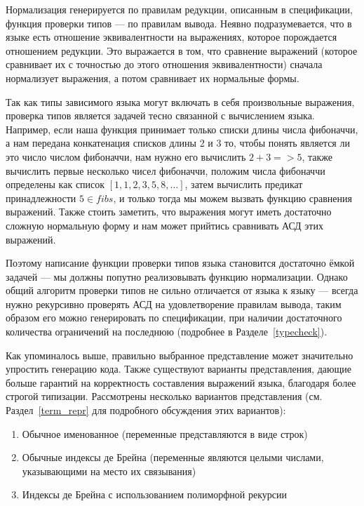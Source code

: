 Нормализация генерируется по правилам редукции, описанным в спецификации, функция проверки типов --- по правилам вывода. Неявно подразумевается, что в языке есть отношение эквивалентности на выражениях, которое порождается отношением редукции. Это выражается в том, что сравнение выражений (которое сравнивает их с точностью до этого отношения эквивалентности) сначала нормализует выражения, а потом сравнивает их нормальные формы.

Так как типы зависимого языка могут включать в себя произвольные выражения, проверка типов является задачей тесно связанной с вычислением языка. Например, если наша функция принимает только списки длины числа фибоначчи, а нам передана конкатенация списков длины 2 и 3 то, чтобы понять является ли это число числом фибоначчи, нам нужно его вычислить $2 + 3 => 5$, также вычислить первые несколько чисел фибоначчи, положим числа фибоначчи определены как список $[1,1,2,3,5,8,...]$, затем вычислить предикат принадлежности $5 \in fibs$, и только тогда мы можем вызвать функцию сравнения выражений. Также стоить заметить, что выражения могут иметь достаточно сложную нормальную форму и нам может прийтись сравнивать АСД этих выражений.

Поэтому написание функции проверки типов языка становится достаточно ёмкой задачей --- мы должны попутно реализовывать функцию нормализации. Однако общий алгоритм проверки типов не сильно отличается от языка к языку --- всегда нужно рекурсивно проверять АСД на удовлетворение правилам вывода, таким образом его можно генерировать по спецификации, при наличии достаточного количества ограничений на последнюю (подробнее в Разделе~\ref{typecheck}).


Как упоминалось выше, правильно выбранное представление может значительно упростить генерацию кода. Также существуют варианты представления, дающие больше гарантий на корректность составления выражений языка, благодаря более строгой типизации. Рассмотрены несколько вариантов представления (см. Раздел~\ref{term_repr} для подробного обсуждения этих вариантов):
\begin{enumerate}
\item Обычное именованное (переменные представляются в виде строк)
\item Обычные индексы де Брейна\cite{de_brujin} (переменные являются целыми числами, указывающими на место их связывания)
\item Индексы де Брейна с использованием полиморфной рекурсии\cite{poly_rec}
\end{enumerate}

